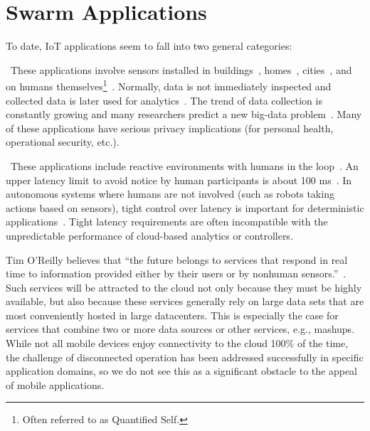 
\section{Swarm Applications}
\label{sec:swarm-applications}

To date, IoT applications seem to fall into two general categories:

~These applications involve sensors
installed in buildings~\cite{dawson2010smap}, homes~\cite{hnat2011hitchhiker},
cities~\cite{sfpark}, and on humans themselves\footnote{Often referred to as
  Quantified Self.}~\cite{fitbit, swan2013quantified}.  Normally, data is not
immediately inspected and collected data is later used for
analytics~\cite{kolter2011redd}.  The trend of data collection is constantly
growing and many researchers predict a new big-data problem~\cite{diaz2012big,
  zaslavsky2013sensing}.  Many of these applications have serious privacy
implications (for personal health, operational security, etc.).

~These applications
include reactive environments with humans in the
loop~\cite{cooperstock1997reactive}.
An upper latency limit to avoid notice by human participants is about 100
ms~\cite{nielsen1994usability}.  In autonomous systems where humans are not
involved (such as robots taking actions based on sensors), tight control over
latency is important for deterministic
applications~\cite{eidson2012distributed}.  Tight latency requirements are often
incompatible with the unpredictable performance of cloud-based analytics or
controllers.

Tim O’Reilly believes that ``the future belongs to services that respond in real
time to information provided either by their users or by nonhuman
sensors.''~\cite{siegele2008let}. Such services will be attracted to the cloud
not only because they must be highly available, but also because these services
generally rely on large data sets that are most conveniently hosted in large
datacenters. This is especially the case for services that combine two or more
data sources or other services, e.g., mashups. While not all mobile devices
enjoy connectivity to the cloud 100\% of the time, the challenge of disconnected
operation has been addressed successfully in specific application domains, so we
do not see this as a significant obstacle to the appeal of mobile applications.

